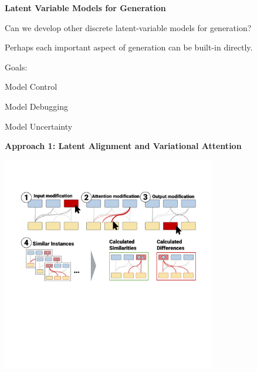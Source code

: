 \documentclass[aspectratio=169]{beamer}
\let\tempone\itemize
\let\temptwo\enditemize
\renewenvironment{itemize}{\tempone\addtolength{\itemsep}{0.5\baselineskip}}{\temptwo}
\newcommand{\air}{\vspace{0.25cm}}
\begin{document}
\begin{frame}
  \begin{center}
    \textbf{ Latent Variable Models for Generation}
  \end{center}

  \begin{itemize}
  \item Can we develop other discrete latent-variable models for generation?
    \air
  \item Perhaps each important aspect of generation can be built-in directly.
    \air
  \item Goals:
    \begin{itemize}
    \item Model Control
    \item Model Debugging
    \item Model Uncertainty
    \end{itemize}
  \end{itemize}
\end{frame}



\begin{frame}
  \begin{center}
    \textbf{Approach 1: Latent Alignment and Variational Attention}
  \end{center}

  \begin{center}
    \includegraphics[width=0.7\textwidth]{AttentionVIS}
  \end{center}
\end{frame}
\end{document}
